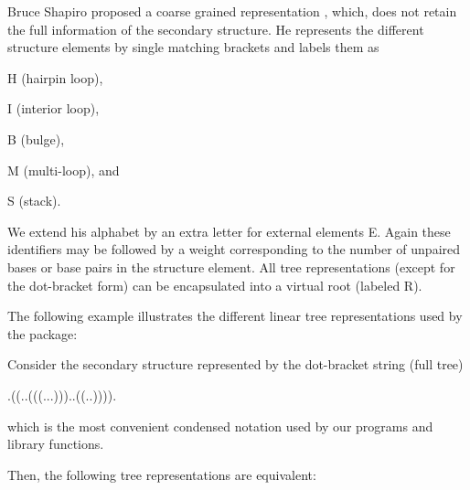 Bruce Shapiro proposed a coarse grained representation \cite{shapiro:1988}, which, does not retain the full information of the secondary structure. He represents the different structure elements by single matching brackets and labels them as


\begin{DoxyItemize}
\item {\ttfamily H} (hairpin loop),
\item {\ttfamily I} (interior loop),
\item {\ttfamily B} (bulge),
\item {\ttfamily M} (multi-\/loop), and
\item {\ttfamily S} (stack).
\end{DoxyItemize}

We extend his alphabet by an extra letter for external elements {\ttfamily E}. Again these identifiers may be followed by a weight corresponding to the number of unpaired bases or base pairs in the structure element. All tree representations (except for the dot-\/bracket form) can be encapsulated into a virtual root (labeled {\ttfamily R}).

The following example illustrates the different linear tree representations used by the package\+:

Consider the secondary structure represented by the dot-\/bracket string (full tree) \begin{DoxyVerb}.((..(((...)))..((..)))). \end{DoxyVerb}
 which is the most convenient condensed notation used by our programs and library functions.

Then, the following tree representations are equivalent\+:


